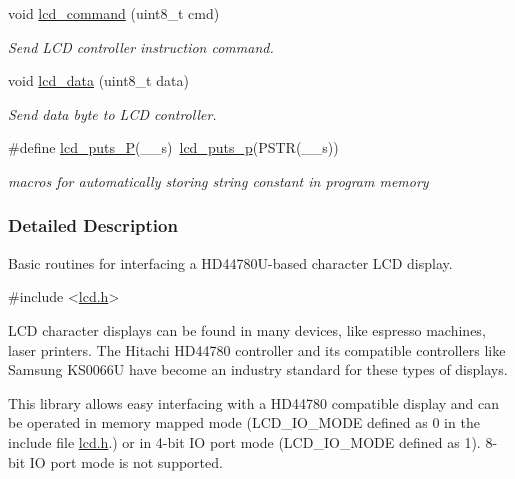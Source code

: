 \begin{DoxyCompactItemize}
void \hyperlink{a00006_gaea9d14f02df06f948cb5a56776980826}{lcd\+\_\+command} (uint8\+\_\+t cmd)
\begin{DoxyCompactList}\small\item\em Send L\+CD controller instruction command. \end{DoxyCompactList}\item 
void \hyperlink{a00006_gad0729d2cba627825a089ca1fff12ba29}{lcd\+\_\+data} (uint8\+\_\+t data)
\begin{DoxyCompactList}\small\item\em Send data byte to L\+CD controller. \end{DoxyCompactList}\item 
\#define \hyperlink{a00006_ga4f1928f1515e21422d5a33af2949f2f7}{lcd\+\_\+puts\+\_\+P}(\+\_\+\+\_\+s)~\hyperlink{a00006_ga9022a24a56a9b15681f62eb6ba77e5de}{lcd\+\_\+puts\+\_\+p}(P\+S\+TR(\+\_\+\+\_\+s))\hypertarget{a00006_ga4f1928f1515e21422d5a33af2949f2f7}{}\label{a00006_ga4f1928f1515e21422d5a33af2949f2f7}

\begin{DoxyCompactList}\small\item\em macros for automatically storing string constant in program memory \end{DoxyCompactList}\end{DoxyCompactItemize}


\subsubsection{Detailed Description}
Basic routines for interfacing a H\+D44780\+U-\/based character L\+CD display. 


\begin{DoxyCode}
\textcolor{preprocessor}{#include <\hyperlink{a00002}{lcd.h}>} 
\end{DoxyCode}


L\+CD character displays can be found in many devices, like espresso machines, laser printers. The Hitachi H\+D44780 controller and its compatible controllers like Samsung K\+S0066U have become an industry standard for these types of displays.

This library allows easy interfacing with a H\+D44780 compatible display and can be operated in memory mapped mode (L\+C\+D\+\_\+\+I\+O\+\_\+\+M\+O\+DE defined as 0 in the include file \hyperlink{a00002}{lcd.\+h}.) or in 4-\/bit IO port mode (L\+C\+D\+\_\+\+I\+O\+\_\+\+M\+O\+DE defined as 1). 8-\/bit IO port mode is not supported.

